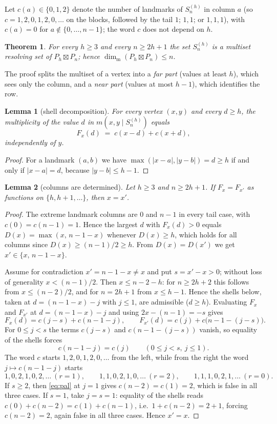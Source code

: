\documentclass[11pt]{amsart}
\newtheorem{theorem}{Theorem}[section]
\newtheorem{lemma}[lemma]{Lemma}
\theoremstyle{remark}
\newcommand{\mdim}{\operatorname{dim}_{\mathrm m}}
\begin{document}
Let $c(a)\in\{0,1,2\}$ denote the number of landmarks of $S^{(h)}_n$ in column $a$ (so $c=1,2,0,1,2,0,\dots$ on the blocks, followed by the tail $1$; $1,1$; or $1,1,1$), with $c(a)=0$ for $a\notin\{0,\dots,n-1\}$; the word $c$ does not depend on $h$.

\begin{theorem}\label{thm:ub}
For every $h\ge 3$ and every $n\ge 2h+1$ the set $S^{(h)}_n$ is a multiset resolving set of $P_h\boxtimes P_n$; hence $\mdim(P_h\boxtimes P_n)\le n$.
\end{theorem}

The proof splits the multiset of a vertex into a \emph{far part} (values at least $h$), which sees only the column, and a \emph{near part} (values at most $h-1$), which identifies the row.

\begin{lemma}[shell decomposition]\label{lem:shell}
For every vertex $(x,y)$ and every $d\ge h$, the multiplicity of the value $d$ in $m(x,y\mid S^{(h)}_n)$ equals
\[
 F_x(d)\;=\;c(x-d)+c(x+d),
\]
independently of $y$.
\end{lemma}

\begin{proof}
For a landmark $(a,b)$ we have $\max(|x-a|,|y-b|)=d\ge h$ if and only if $|x-a|=d$, because $|y-b|\le h-1$.
\end{proof}

\begin{lemma}[columns are determined]\label{lem:S}
Let $h\ge 3$ and $n\ge 2h+1$.  If $F_x=F_{x'}$ as functions on $\{h,h+1,\dots\}$, then $x=x'$.
\end{lemma}

\begin{proof}
The extreme landmark columns are $0$ and $n-1$ in every tail case, with $c(0)=c(n-1)=1$.  Hence the largest $d$ with $F_x(d)>0$ equals $D(x)=\max(x,\,n-1-x)$ whenever $D(x)\ge h$, which holds for all columns since $D(x)\ge(n-1)/2\ge h$.  From $D(x)=D(x')$ we get $x'\in\{x,\,n-1-x\}$.

Assume for contradiction $x'=n-1-x\ne x$ and put $s=x'-x>0$; without loss of generality $x<(n-1)/2$.  Then $x\le n-2-h$: for $n\ge 2h+2$ this follows from $x\le(n-2)/2$, and for $n=2h+1$ from $x\le h-1$.  Hence the shells below, taken at $d=(n-1-x)-j$ with $j\le 1$, are admissible ($d\ge h$).  Evaluating $F_x$ and $F_{x'}$ at $d=(n-1-x)-j$ and using $2x-(n-1)=-s$ gives
\[
 F_x(d)=c(j-s)+c(n-1-j),
 \qquad
 F_{x'}(d)=c(j)+c\big(n-1-(j-s)\big).
\]
For $0\le j<s$ the terms $c(j-s)$ and $c(n-1-(j-s))$ vanish, so equality of the shells forces
\begin{equation}\label{eq:pal}
 c(n-1-j)=c(j)\qquad(0\le j<s,\ j\le 1).
\end{equation}
The word $c$ starts $1,2,0,1,2,0,\dots$ from the left, while from the right the word $j\mapsto c(n-1-j)$ starts
\[
 1,0,2,1,0,2,\dots\ (r=1),\qquad
 1,1,0,2,1,0,\dots\ (r=2),\qquad
 1,1,1,0,2,1,\dots\ (r=0).
\]
If $s\ge 2$, then \eqref{eq:pal} at $j=1$ gives $c(n-2)=c(1)=2$, which is false in all three cases.  If $s=1$, take $j=s=1$: equality of the shells reads $c(0)+c(n-2)=c(1)+c(n-1)$, i.e.\ $1+c(n-2)=2+1$, forcing $c(n-2)=2$, again false in all three cases.  Hence $x'=x$.
\end{proof}
\end{document}
